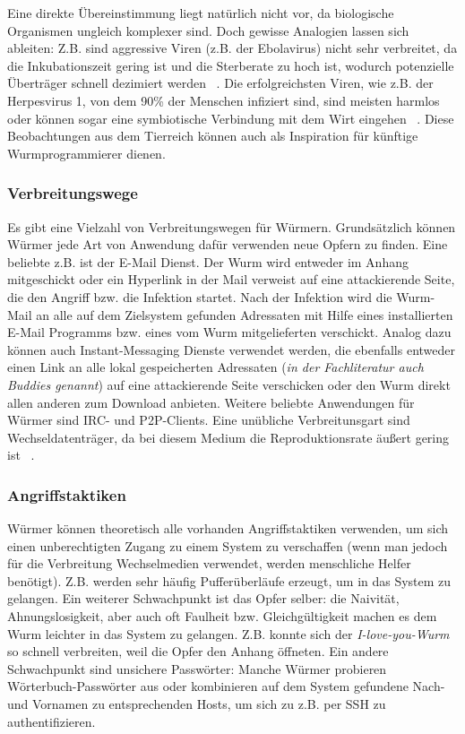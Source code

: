 Eine direkte Übereinstimmung liegt natürlich nicht vor, da biologische
Organismen ungleich komplexer sind. Doch gewisse Analogien lassen sich
ableiten: Z.B. sind aggressive Viren (z.B. der Ebolavirus) nicht sehr
verbreitet, da die Inkubationszeit gering ist und die Sterberate zu
hoch ist, wodurch potenzielle Überträger schnell dezimiert werden
~\cite{wuermer-ebola}. Die erfolgreichsten Viren, wie z.B. der
Herpesvirus 1, von dem 90\% der Menschen infiziert sind, sind meisten
harmlos oder können sogar eine symbiotische Verbindung mit dem Wirt
eingehen ~\cite{wuermer-herpes}.  Diese Beobachtungen aus dem
Tierreich können auch als Inspiration für künftige Wurmprogrammierer
dienen.

\subsubsection {Verbreitungswege}

Es gibt eine Vielzahl von Verbreitungswegen für Würmern. Grundsätzlich
können Würmer jede Art von Anwendung dafür verwenden neue Opfern zu
finden. Eine beliebte z.B. ist der E-Mail Dienst. Der Wurm wird
entweder im Anhang mitgeschickt oder ein Hyperlink in der Mail
verweist auf eine attackierende Seite, die den Angriff bzw. die
Infektion startet. Nach der Infektion wird die Wurm-Mail an alle auf
dem Zielsystem gefunden Adressaten mit Hilfe eines installierten
E-Mail Programms bzw. eines vom Wurm mitgelieferten verschickt. Analog
dazu können auch Instant-Messaging Dienste verwendet werden, die
ebenfalls entweder einen Link an alle lokal gespeicherten Adressaten
(\textit{in der Fachliteratur auch Buddies genannt}) auf eine
attackierende Seite verschicken oder den Wurm direkt allen anderen zum
Download anbieten. Weitere beliebte Anwendungen für Würmer sind IRC-
und P2P-Clients. Eine unübliche Verbreitunsgart sind
Wechseldatenträger, da bei diesem Medium die Reproduktionsrate äußert
gering ist ~\cite{wuermer-ways}.

\subsubsection {Angriffstaktiken}

Würmer können theoretisch alle vorhanden Angriffstaktiken verwenden,
um sich einen unberechtigten Zugang zu einem System zu verschaffen
(wenn man jedoch für die Verbreitung Wechselmedien verwendet, werden
menschliche Helfer benötigt). Z.B. werden sehr häufig Pufferüberläufe
erzeugt, um in das System zu gelangen. Ein weiterer Schwachpunkt ist
das Opfer selber: die Naivität, Ahnungslosigkeit, aber auch oft
Faulheit bzw. Gleichgültigkeit machen es dem Wurm leichter in das
System zu gelangen.  Z.B. konnte sich der \textit{I-love-you-Wurm} so
schnell verbreiten, weil die Opfer den Anhang öffneten.  Ein andere
Schwachpunkt sind unsichere Passwörter: Manche Würmer probieren
Wörterbuch-Passwörter aus oder kombinieren auf dem System gefundene
Nach- und Vornamen zu entsprechenden Hosts, um sich zu z.B. per SSH zu
authentifizieren.


